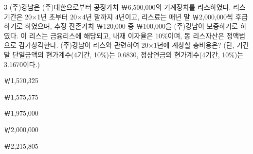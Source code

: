 \begin{question}{3}
(주)강남은 (주)대한으로부터 공정가치 ￦6,500,000의 기계장치를 리스하였다. 리스기간은 20×1년 초부터 20×4년 말까지 4년이고, 리스료는 매년 말 ￦2,000,000씩 후급하기로 하였으며, 추정 잔존가치 ￦120,000 중 ￦100,000을 (주)강남이 보증하기로 하였다. 이 리스는 금융리스에 해당되고, 내재 이자율은 10\%이며, 동 리스자산은 정액법으로 감가상각한다. (주)강남이 리스와 관련하여 20×1년에 계상할 총비용은? (단, 기간말 단일금액의 현가계수(4기간, 10\%)는 0.6830, 정상연금의 현가계수(4기간, 10\%)는 3.1670이다.)
\begin{choices}
  \item ￦1,570,325
  \item ￦1,575,575
  \item ￦1,975,000
  \item ￦2,000,000
  \item ￦2,215,805
\end{choices}
\end{question}
